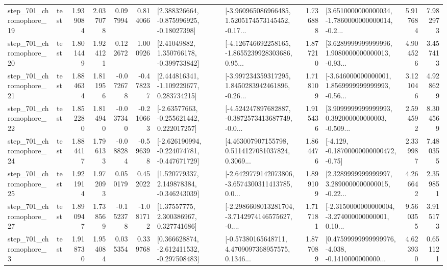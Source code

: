 \begin{tabular}{llrrrrllrlrr}
  step\_701\_chromophore\_19 &      test &      1.939084 &    2.037078 &      0.097994 &  0.814066 &    [2.388326664, -0.875996925, -0.18027398] &  [-3.960965086966485, 1.5205174573145452, -0.17... &       1.736888 &  [3.6510000000000034, -1.7860000000000014, -0.2... &            5.917684 &          7.982973 \\
  step\_701\_chromophore\_20 &      test &      1.801449 &    1.924121 &      0.122672 &  1.000926 &     [2.41049882, 1.350766178, -0.399733842] &  [-4.126746692258165, -1.8655239928303686, 0.95... &       1.877210 &  [3.6289999999999996, 1.9080000000000013, -0.93... &            4.904526 &          3.457413 \\
  step\_701\_chromophore\_21 &      test &      1.884634 &    1.811956 &     -0.072678 & -0.478237 &    [2.444816341, -1.109229677, 0.283734215] &  [-3.997234359317295, 1.8450283942461896, -0.26... &       1.718109 &  [-3.646000000000001, 1.8569999999999993, -0.56... &            3.121046 &          4.928629 \\
  step\_701\_chromophore\_22 &      test &      1.852280 &    1.814940 &     -0.037340 & -0.210663 &    [-2.63577663, -0.255621442, 0.222017257] &  [-4.524247897682887, -0.3872573413687749, -0.0... &       1.915436 &  [3.9099999999999993, 0.392000000000003, -0.509... &            2.594592 &          8.304569 \\
  step\_701\_chromophore\_24 &      test &      1.884417 &    1.796133 &     -0.088284 & -0.596398 &  [-2.626190994, -0.224074781, -0.447671729] &  [4.463007907155798, 0.5114127081037824, 0.3069... &       1.864476 &              [-4.129, -0.18700000000000472, -0.75] &            2.339987 &          7.480355 \\
  step\_701\_chromophore\_25 &      test &      1.921914 &    1.972093 &      0.050179 &  0.452022 &    [1.520779337, 2.149878384, -0.346243039] &  [-2.6429779142073806, -3.6574300311413785, 0.0... &       1.899109 &  [2.3289999999999997, 3.2890000000000015, -0.22... &            4.266642 &          2.359851 \\
  step\_701\_chromophore\_27 &      test &      1.890947 &    1.738569 &     -0.152378 & -1.081712 &      [1.37557775, 2.300386967, 0.327741686] &  [-2.2986608013281704, -3.7142974146575627, -0.... &       1.717181 &  [-2.3150000000000004, -3.274000000000001, 0.10... &            9.560355 &          3.915173 \\
   step\_701\_chromophore\_3 &      test &      1.918730 &    1.954084 &      0.035354 &  0.339768 &   [0.366628874, -2.612411532, -0.297508483] &  [-0.57380165648711, 4.4709097368957575, 0.1346... &       1.877089 &  [0.47599999999999976, -4.038, -0.1410000000000... &            4.623930 &          0.651121 \\

\end{tabular}

